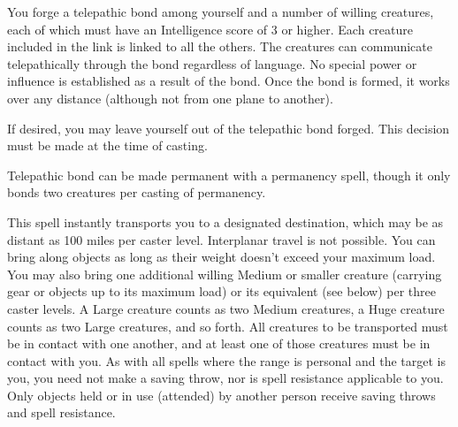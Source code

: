 \begin{multicols}{2}
\begin{small}
\noindent You forge a telepathic bond among yourself and a number of willing creatures, each of which must have an Intelligence score of 3 or higher. Each creature included in the link is linked to all the others. The creatures can communicate telepathically through the bond regardless of language. No special power or influence is established as a result of the bond. Once the bond is formed, it works over any distance (although not from one plane to another).

\smallskip\noindent If desired, you may leave yourself out of the telepathic bond forged. This decision must be made at the time of casting.

\smallskip\noindent Telepathic bond can be made permanent with a permanency spell, though it only bonds two creatures per casting of permanency.


\noindent This spell instantly transports you to a designated destination, which may be as distant as 100 miles per caster level. Interplanar travel is not possible. You can bring along objects as long as their weight doesn't exceed your maximum load. You may also bring one additional willing Medium or smaller creature (carrying gear or objects up to its maximum load) or its equivalent (see below) per three caster levels. A Large creature counts as two Medium creatures, a Huge creature counts as two Large creatures, and so forth. All creatures to be transported must be in contact with one another, and at least one of those creatures must be in contact with you. As with all spells where the range is personal and the target is you, you need not make a saving throw, nor is spell resistance applicable to you. Only objects held or in use (attended) by another person receive saving throws and spell resistance.


\end{small}
\end{multicols}
